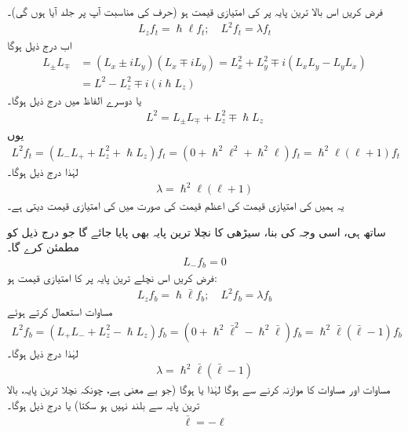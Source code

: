 فرض کریں اس بالا ترین پایہ پر  کی امتیازی قیمت  ہو (حرف  کی مناسبت آپ پر جلد آیا ہوں گی)۔ 
\begin{align}
L_z f_t = \hslash \ell f_{t}; \quad L^2 f_t = \lambda f_t
\end{align}
اب درج ذیل ہوگا 
\begin{align*} 
L_{\pm} L_{\mp}&= (L_x \pm i L_y) (L_x \mp i L_y) = L_x^2 + L_y^2 \mp i (L_x L_y - L_y L_x) \\
&= L^2 - L_z^2 \mp i (i \hslash L_z)
\end{align*}
یا دوسرے الفاظ میں درج ذیل ہوگا۔
\begin{align}\label{مساوات_تین_ابعادی_مربع_بصورت_رفعت}
L^2 = L_{\pm} L_{\mp} + L_z^2 \mp \hslash L_z
\end{align}
یوں 
\begin{align*}
L^2 f_t = (L_{-} L_{+} + L_z^2 + \hslash L_z) f_t = (0 + \hslash^2 \ell^2 + \hslash^2 \ell) f_t = \hslash^2 \ell (\ell + 1) f_t
\end{align*}
لہٰذا درج ذیل ہوگا۔
\begin{align}\label{مساوات_تین_ابعادی_لمڈا_تعلق_الف}
\lambda = \hslash^2 \ell (\ell + 1)
\end{align}
یہ ہمیں  کی امتیازی قیمت کی اعظم قیمت کی صورت میں  کی امتیازی قیمت دیتی ہے۔

 ساتھ ہی، اسی وجہ کی بنا، سیڑھی کا نچلا ترین پایہ  بھی پایا جائے گا جو درج ذیل کو مطمئن کرے گا۔ 
\begin{align}
L_{-} f_b = 0
\end{align}
فرض کریں اس نچلے ترین پایہ پر  کا امتیازی قیمت  ہو:
\begin{align}
L_z f_b = \hslash \bar{\ell} f_b ; \quad L^2 f_b = \lambda f_b
\end{align}
مساوات  استعمال کرتے ہوئے
\begin{align*}
L^2 f_b = (L_{+} L_{-} + L_z^2 - \hslash L_z ) f_b = (0 + \hslash^2 \bar{\ell}^{2} - \hslash^2 \bar{\ell}) f_b = \hslash^2 \bar{\ell} (\bar{\ell} - 1) f_b
\end{align*}
لہٰذا درج ذیل ہوگا۔
\begin{align}\label{مساوات_تین_ابعادی_لمڈا_تعلق_ب}
\lambda = \hslash^2 \bar{\ell} (\bar{\ell} - 1)
\end{align}
مساوات  اور مساوات  کا موازنہ کرنے سے  ہوگا لہٰذا یا  ہوگا (جو بے معنی ہے، چونکہ نچلا ترین پایہ، بالا ترین پایہ سے بلند نہیں ہو سکتا) یا درج ذیل ہوگا۔
\begin{align}
\bar{\ell} = - \ell
\end{align}

